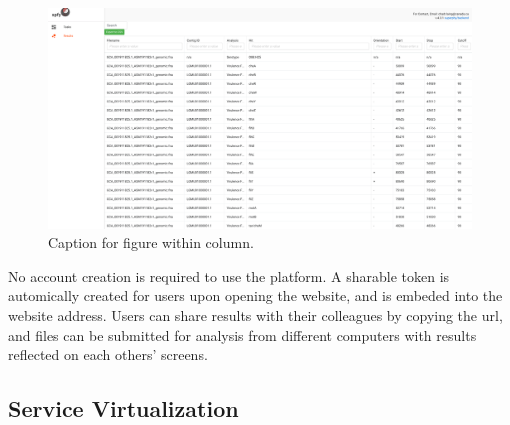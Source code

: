 \documentclass{article}
\begin{document}
\begin{figure}[!hb]
\begin{center}
\includegraphics[width=\textwidth]{images/tables.png}
\end{center}
\caption{Caption for figure within column.}
\label{fig-tables}
\end{figure}

No account creation is required to use the platform. A sharable token is automically created for users upon opening the website, and is embeded into the website address. Users can share results with their colleagues by copying the url, and files can be submitted for analysis from different computers with results reflected on each others' screens.

\subsection{Service Virtualization}


\end{document}
